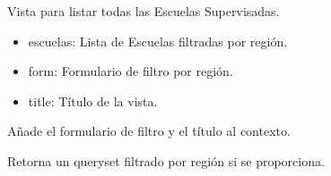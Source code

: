 \documentclass[letterpaper,10pt,spanish]{sphinxmanual}
\begin{document}
\begin{fulllineitems}

\pysigstartsignatures
{}
\pysigstopsignatures
\sphinxAtStartPar
Vista para listar todas las Escuelas Supervisadas.
\begin{description}
\begin{itemize}
\item {} 
\sphinxAtStartPar
escuelas: Lista de Escuelas filtradas por región.

\item {} 
\sphinxAtStartPar
form: Formulario de filtro por región.

\item {} 
\sphinxAtStartPar
title: Título de la vista.

\end{itemize}

\end{description}


\begin{fulllineitems}

\pysigstartsignatures
{}
\pysigstopsignatures
\end{fulllineitems}



\begin{fulllineitems}

\pysigstartsignatures
{}
\pysigstopsignatures
\sphinxAtStartPar
Añade el formulario de filtro y el título al contexto.

\end{fulllineitems}



\begin{fulllineitems}

\pysigstartsignatures
{}
\pysigstopsignatures
\sphinxAtStartPar
Retorna un queryset filtrado por región si se proporciona.

\end{fulllineitems}




\end{fulllineitems}
\end{document}
